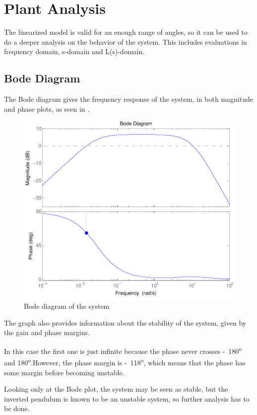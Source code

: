 \section{Plant Analysis}
The linearized model is valid for an enough range of angles, so it can be used to do a deeper analysis on the behavior of the system. This includes evaluations in frequency domain, s-domain and L(s)-domain.

\subsection{Bode Diagram}
The Bode diagram gives the frequency response of the system, in both magnitude and phase plots, as seen in .
\begin{figure}[H] 
	\centering 
	\includegraphics[scale=0.65]{figures/bodeTF}
	\caption{Bode diagram of the system}
	\label{bodeTF}
\end{figure} 

The graph also provides information about the stability of the system, given by the gain and phase margins. 

In this case the first one is just infinite because the phase never crosses \si{-180^o} and \si{180^o}.However, the phase margin is \si{-118^o}, which means that the phase has some margin before becoming unstable.

Looking only at the Bode plot, the system may be seen as stable, but the inverted pendulum is known to be an unstable system, so further analysis has to be done.

